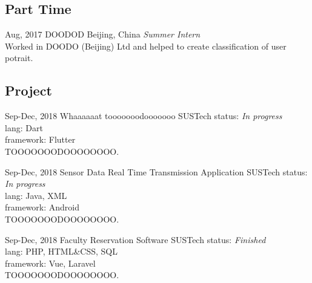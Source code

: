 \documentclass[]{friggeri-cv-a4}
\begin{document}

\subsection{Part Time}

\begin{entrylist}

\entry
{Aug, 2017}
{DOODOD}
{Beijing, China}
{\emph{Summer Intern} \\
Worked in DOODO (Beijing) Ltd and helped to create classification of user potrait.}




\end{entrylist}


\subsection{Project}

\begin{entrylist}


\entry
{Sep-Dec, 2018}
{Whaaaaaat tooooooodooooooo}
{SUSTech}
{
    status: \emph{In progress}\\
    lang: Dart\\
    framework: Flutter\\
    TOOOOOOODOOOOOOOO.
}


\entry
{Sep-Dec, 2018}
{Sensor Data Real Time Transmission Application}
{SUSTech}
{
    status: \emph{In progress}\\
    lang: Java, XML\\
    framework: Android\\
    TOOOOOOODOOOOOOOO.
}


\entry
{Sep-Dec, 2018}
{Faculty Reservation Software}
{SUSTech}
{
    status: \emph{Finished}\\
    lang: PHP, HTML\&CSS, SQL\\
    framework: Vue, Laravel\\
    TOOOOOOODOOOOOOOO.
}


\end{entrylist}
\end{document}
